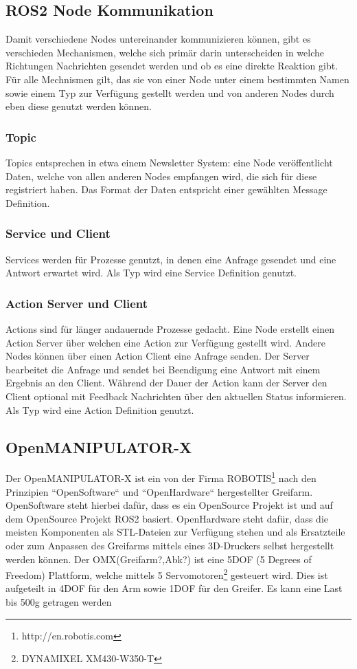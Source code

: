 \subsection{ROS2 Node Kommunikation}{\label{rosnodecomm}
Damit verschiedene Nodes untereinander kommunizieren können, gibt es verschieden Mechanismen, welche sich primär darin unterscheiden in welche Richtungen Nachrichten gesendet werden und ob es eine direkte Reaktion gibt. Für alle Mechnismen gilt, das sie von einer Node unter einem bestimmten Namen sowie einem Typ zur Verfügung gestellt werden und von anderen Nodes durch eben diese genutzt werden können.
\subsubsection{Topic}
Topics entsprechen in etwa einem Newsletter System: eine Node veröffentlicht Daten, welche von allen anderen Nodes empfangen wird, die sich für diese registriert haben. Das Format der Daten entspricht einer gewählten Message Definition.
\subsubsection{Service und Client}
Services werden für Prozesse genutzt, in denen eine Anfrage gesendet und eine Antwort erwartet wird. Als Typ wird eine Service Definition genutzt.
\subsubsection{Action Server und Client}
Actions sind für länger andauernde Prozesse gedacht. Eine Node erstellt einen Action Server über welchen eine Action zur Verfügung gestellt wird. Andere Nodes können über einen Action Client eine Anfrage senden. Der Server bearbeitet die Anfrage und sendet bei Beendigung eine Antwort mit einem Ergebnis an den Client. Während der Dauer der Action kann der Server den Client optional mit Feedback Nachrichten über den aktuellen Status informieren.\\
Als Typ wird eine Action Definition genutzt. 
\subsection{OpenMANIPULATOR-X}
Der OpenMANIPULATOR-X ist ein von der Firma ROBOTIS{\footnote{http://en.robotis.com}} nach den Prinzipien ``OpenSoftware`` und ``OpenHardware`` hergestellter Greifarm. OpenSoftware steht hierbei dafür, dass es ein OpenSource Projekt ist und auf dem OpenSource Projekt \ac{ROS2} basiert. OpenHardware steht dafür, dass die meisten Komponenten als STL-Dateien zur Verfügung stehen und als Ersatzteile oder zum Anpassen des Greifarms mittels eines 3D-Druckers selbst hergestellt werden können. \newline
Der OMX(Greifarm?,Abk?) ist eine 5DOF (5 Degrees of Freedom) Plattform, welche mittels 5 Servomotoren{\footnote{DYNAMIXEL XM430-W350-T}} gesteuert wird. Dies ist aufgeteilt in 4DOF für den Arm sowie 1DOF für den Greifer.
Es kann eine Last bis 500g getragen werden
}
